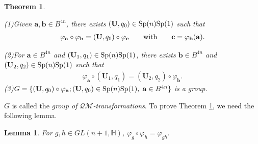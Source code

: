 \documentclass[a4paper,11pt]{amsart}
\numberwithin{equation}{section}
\newtheorem{thm}{Theorem}[section]
\newtheorem{lem}{Lemma}[section]
\begin{document}
\begin{thm}\label{thm mobius}

(1)\;Given $\mathbf{a},\mathbf{b}\in B^{4n}$, there exists $(\mathbf{U}, q_0)\in {\rm Sp}(n){\rm Sp}(1)$ such that
\begin{equation}\begin{aligned}\label{m 1}
\varphi_{\mathbf{a}}\circ\varphi_{\mathbf{b}}=(\mathbf{U},q_0)\circ\varphi_{\mathbf{c}}\qquad {\rm with }\qquad\mathbf{c}=\varphi_{\mathbf{b}}(\mathbf{a}).
\end{aligned}\end{equation}

(2)\;For $\mathbf{a}\in B^{4n}$ and $(\mathbf{U}_1,q_1)\in {\rm Sp}(n){\rm Sp}(1)$, there exists $\mathbf{b}\in B^{4n}$ and $(\mathbf{U}_2,q_2)\in {\rm Sp}(n){\rm Sp}(1)$ such that
\begin{equation}\begin{aligned}\label{m 2}
\varphi_{\mathbf{a}}\circ (\mathbf{U}_1,q_1)=(\mathbf{U}_2,q_2)\circ\varphi_{\mathbf{b}}.
\end{aligned}\end{equation}
(3)\;$G=\{(\mathbf{U},q_0)\circ\varphi_{\mathbf{a}} ;(\mathbf{U},q_0)\in {\rm Sp}(n){\rm Sp}(1),\;\mathbf{a}\in B^{4n}\}$ is a group.
\end{thm}
$G$ is called the {\it group of $\mathcal{QM}$-transformations}. To prove Theorem \ref{thm mobius}, we need the following lemma.

\begin{lem}\cite[(2.5)]{wang4}\label{multip}
For $g,h\in  GL(n+1,\mathbb{H})$, $\varphi_{g}\circ\varphi_{h}=\varphi_{gh}.$
\end{lem}
\end{document}
